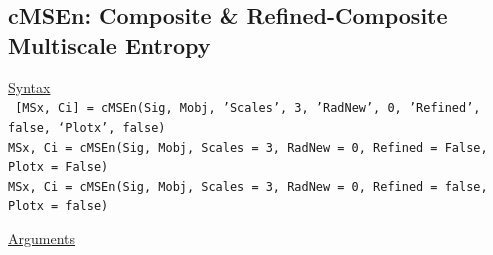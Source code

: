 \documentclass[12pt, a4paper, titlepage, openany]{book}
\begin{document}
\newpage
\subsection{\normalsize cMSEn: \hspace{10mm} Composite \& Refined-Composite Multiscale Entropy} \label{cMSEn}
\noindent\ul{Syntax} \vspace{6mm} \\ \noindent \texttt{\footnotesize
[MSx, Ci] = cMSEn(Sig, Mobj, 'Scales', 3, 'RadNew', 0, 'Refined', false, ‘Plotx’, false)\\
MSx, Ci = cMSEn(Sig, Mobj, Scales = 3, RadNew = 0, Refined = False, Plotx = False)\\ 
MSx, Ci = cMSEn(Sig, Mobj, Scales = 3, RadNew = 0, Refined = false, Plotx = false)}

\noindent \ul{Arguments}
\end{document}

